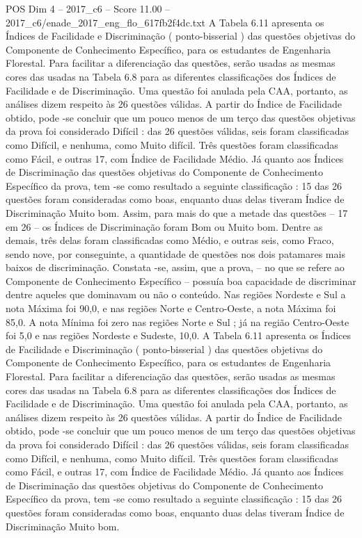 \begin{textsample}{POS Dim 4 – 2017\_c6 – Score 11.00 – 2017\_c6/enade\_2017\_eng\_flo\_617fb2f4dc.txt}
A Tabela 6.11 apresenta os Índices de Facilidade e Discriminação ( ponto-bisserial ) das questões objetivas do Componente de Conhecimento Específico, para os estudantes de Engenharia Florestal.
Para facilitar a diferenciação das questões, serão usadas as mesmas cores das usadas na Tabela 6.8 para as diferentes classificações dos Índices de Facilidade e de Discriminação.
Uma questão foi anulada pela CAA, portanto, as análises dizem respeito às 26 questões válidas.
A partir do Índice de Facilidade obtido, pode -se concluir que um pouco menos de um terço das questões objetivas da prova foi considerado Difícil : das 26 questões válidas, seis foram classificadas como Difícil, e nenhuma, como Muito difícil.
Três questões foram classificadas como Fácil, e outras 17, com Índice de Facilidade Médio.
Já quanto aos Índices de Discriminação das questões objetivas do Componente de Conhecimento Específico da prova, tem -se como resultado a seguinte classificação : 15 das 26 questões foram consideradas como boas, enquanto duas delas tiveram Índice de Discriminação Muito bom.
Assim, para mais do que a metade das questões – 17 em 26 – os Índices de Discriminação foram Bom ou Muito bom.
Dentre as demais, três delas foram classificadas como Médio, e outras seis, como Fraco, sendo nove, por conseguinte, a quantidade de questões nos dois patamares mais baixos de discriminação.
Constata -se, assim, que a prova, – no que se refere ao Componente de Conhecimento Específico – possuía boa capacidade de discriminar dentre aqueles que dominavam ou não o conteúdo.
Nas regiões Nordeste e Sul a nota Máxima foi 90,0, e nas regiões Norte e Centro-Oeste, a nota Máxima foi 85,0.
A nota Mínima foi zero nas regiões Norte e Sul ; já na região Centro-Oeste foi 5,0 e nas regiões Nordeste e Sudeste, 10,0.
A Tabela 6.11 apresenta os Índices de Facilidade e Discriminação ( ponto-bisserial ) das questões objetivas do Componente de Conhecimento Específico, para os estudantes de Engenharia Florestal.
Para facilitar a diferenciação das questões, serão usadas as mesmas cores das usadas na Tabela 6.8 para as diferentes classificações dos Índices de Facilidade e de Discriminação.
Uma questão foi anulada pela CAA, portanto, as análises dizem respeito às 26 questões válidas.
A partir do Índice de Facilidade obtido, pode -se concluir que um pouco menos de um terço das questões objetivas da prova foi considerado Difícil : das 26 questões válidas, seis foram classificadas como Difícil, e nenhuma, como Muito difícil.
Três questões foram classificadas como Fácil, e outras 17, com Índice de Facilidade Médio.
Já quanto aos Índices de Discriminação das questões objetivas do Componente de Conhecimento Específico da prova, tem -se como resultado a seguinte classificação : 15 das 26 questões foram consideradas como boas, enquanto duas delas tiveram Índice de Discriminação Muito bom.

\end{textsample}
